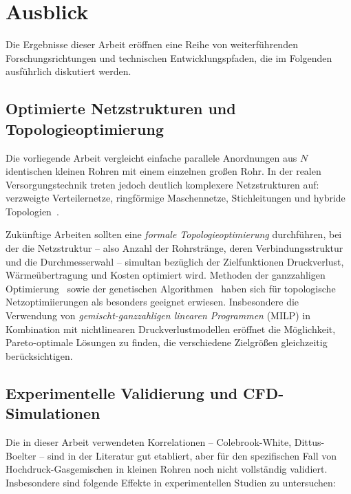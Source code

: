 ﻿\documentclass[12pt,a4paper,twoside]{article}
\theoremstyle{plain}
\theoremstyle{definition}
\theoremstyle{remark}
\begin{document}
\section{Ausblick}
\label{sec:ausblick}

Die Ergebnisse dieser Arbeit eröffnen eine Reihe von weiterführenden
Forschungsrichtungen und technischen Entwicklungspfaden, die im Folgenden
ausführlich diskutiert werden.

\subsection{Optimierte Netzstrukturen und Topologieoptimierung}
\label{ssec:ausblick_topologie}

Die vorliegende Arbeit vergleicht einfache parallele Anordnungen aus $N$
identischen kleinen Rohren mit einem einzelnen großen Rohr.
In der realen Versorgungstechnik treten jedoch deutlich komplexere Netzstrukturen
auf: verzweigte Verteilernetze, ringförmige Maschennetze, Stichleitungen und
hybride Topologien~\cite{Helbing2015}.

Zukünftige Arbeiten sollten eine \emph{formale Topologieoptimierung}
durchführen, bei der die Netzstruktur -- also Anzahl der Rohrstränge, deren
Verbindungsstruktur und die Durchmesserwahl -- simultan bezüglich der
Zielfunktionen Druckverlust, Wärmeübertragung und Kosten optimiert wird.
Methoden der ganzzahligen Optimierung~\cite{Floudas1995} sowie der
genetischen Algorithmen~\cite{Goldberg1989} haben sich für topologische
Netzoptimiierungen als besonders geeignet erwiesen.
Insbesondere die Verwendung von \emph{gemischt-ganzzahligen linearen
Programmen} (MILP) in Kombination mit nichtlinearen Druckverlustmodellen
eröffnet die Möglichkeit, Pareto-optimale Lösungen zu finden, die
verschiedene Zielgrößen gleichzeitig berücksichtigen.

\subsection{Experimentelle Validierung und CFD-Simulationen}
\label{ssec:ausblick_exp}

Die in dieser Arbeit verwendeten Korrelationen -- Colebrook-White, Dittus-Boelter
-- sind in der Literatur gut etabliert, aber für den spezifischen Fall von
Hochdruck-Gasgemischen in kleinen Rohren noch nicht vollständig validiert.
Insbesondere sind folgende Effekte in experimentellen Studien zu untersuchen:
\end{document}
